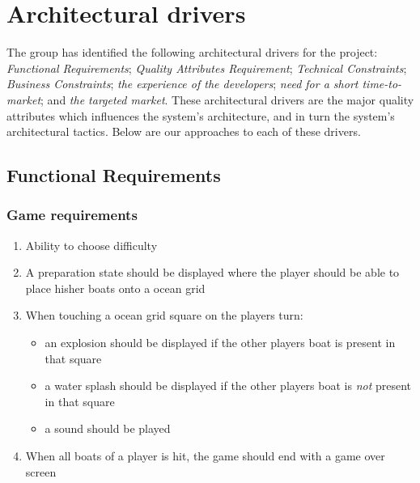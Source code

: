 \chapter{Architectural drivers}
The group has identified the following architectural drivers for the project: \emph{Functional Requirements}; \emph{Quality Attributes Requirement}; \emph{Technical Constraints}; \emph{Business Constraints}; \emph{the experience of the developers}; \emph{need for a short time-to-market}; and \emph{the targeted market}. These architectural drivers are the major quality attributes which influences the system's architecture, and in turn the system's architectural tactics\cite{pensum}. Below are our approaches to each of these drivers.



	\section{Functional Requirements}
		\subsection{Game requirements}
		\begin{enumerate}
			\item Ability to choose difficulty
			\item A preparation state should be displayed where the player should be able to place his\/her boats onto a ocean grid
			\item When touching a ocean grid square on the players turn:
				\begin{itemize}
					\item an explosion should be displayed if the other players boat is present in that square
					\item a water splash should be displayed if the other players boat is \emph{not} present in that square
					\item a sound should be played
				\end{itemize}
			\item When all boats of a player is hit, the game should end with a game over screen
		\end{enumerate}


